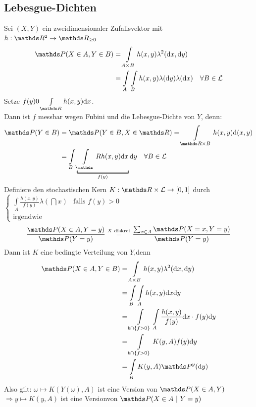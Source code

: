 \subsection{Lebesgue-Dichten}
\label{sub:lebesgue_dichten}
Sei $(X,Y)$ ein zweidimensionaler Zufallsvektor mit  $h:\R^2\to \R_{\ge 0}$\\
\begin{equation*}
\begin{aligned}
	\Pw(X\in A,Y\in B) &= \int\limits_{A\times B}h(x,y)\lambda^2(\dint x,\dint y)\\
	&= \int\limits_A\int\limits_B h(x,y) \lambda(\dint y)\lambda(\dint x)\quad \forall B\in \mathcal{L}
\end{aligned}
\end{equation*}
Setze $f(y)0\int\limits_{\R}h(x,y)\dint x$.\\
Dann ist $f$ messbar wegen Fubini und die Lebesgue-Dichte von $Y$, denn:
\begin{equation*}
\begin{aligned}
	\Pw(Y\in B) &= \Pw(Y\in B,X\in \R)= \int\limits_{\R\times B}h(x,y)\dint(x,y)\\
	&=\int\limits_B\underbracket{\int\limits_\R h(x,y)\dint x}_{f(y)}\dint y \quad \forall B\in \mathcal{L}
\end{aligned}
\end{equation*}
Definiere den stochastischen Kern $K:\R\times \mathcal{L}\to[0,1]$ durch
$\left\{\begin{array}{cl} \int\limits_A \frac{h(x,y)}{f(y)}\lambda(\dint x) & \text{falls } f(y)>0\\ \text{irgendwie}    \end{array}\right.$
\[ \frac{\Pw(X\in A,Y=y)}{\Pw(Y=y)}\stackrel{X\text{ diskret}}{=} \frac{\sum_{x\in A}\Pw(X=x,Y=y)}{\Pw(Y=y)} \]
Dann ist $K$ eine bedingte Verteilung von $Y$,denn
\begin{equation*}
\begin{aligned}
	\Pw(X\in A,Y\in B) &= \int\limits_{A\times B} h(x,y)\lambda^2(\dint x, \dint y)\\
	&= \int\limits_B\int\limits_Ah(x,y)\dint x \dint y\\
	&= \int\limits_{b\cap\{f>0\}}\int\limits_A \frac{h(x,y)}{f(y)}\dint x \cdot f(y)\dint y\\
	&= \int\limits_{b\cap\{f>0\}}K(y,A)f(y)\dint y\\
	&= \int\limits_BK(y,A)\Pw^y(\dint y)
\end{aligned}
\end{equation*}
Also gilt: $\omega\mapsto K(Y(\omega),A)$ ist eine Version von $\Pw(X\in A,Y)$\\
$\Rightarrow y\mapsto K(y,A)$ ist eine Versionvon $\Pw(X\in A~|~Y=y)$


